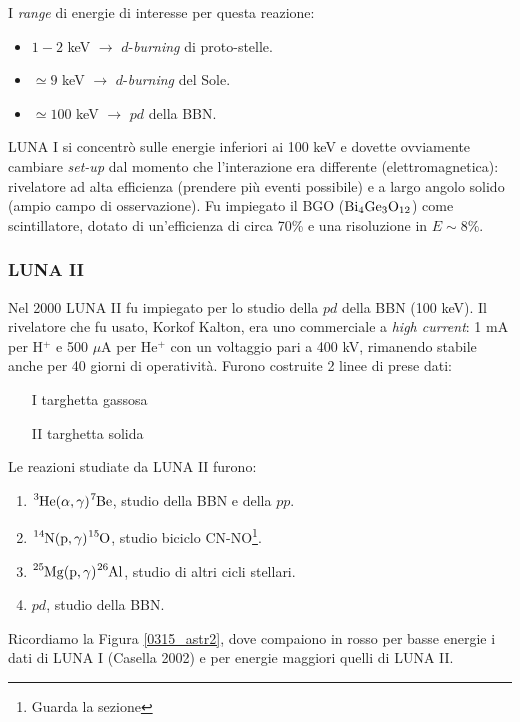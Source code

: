 I \textit{range} di energie di interesse per questa reazione:
\begin{itemize}
	\item $1-2$ keV $\to$ $d$-\textit{burning} di proto-stelle.
	\item $\simeq 9$ keV $\to$ $d$-\textit{burning} del Sole.
	\item $\simeq 100$ keV $\to$ $pd$ della BBN.
\end{itemize}
LUNA I si concentrò sulle energie inferiori ai 100 keV e dovette ovviamente cambiare \textit{set-up} dal momento che l'interazione era differente (elettromagnetica): rivelatore ad alta efficienza (prendere più eventi possibile) e a largo angolo solido (ampio campo di osservazione). Fu impiegato il BGO%
 ($\ce{Bi_4}\ce{Ge_3}\ce{O_{12}}$) come scintillatore, dotato di un'efficienza di circa 70\% e una risoluzione in $E\sim 8\%$.


\subsubsection{LUNA II}\label{sec-LUNAII}
Nel 2000 LUNA II fu impiegato per lo studio della $pd$ della BBN (100 keV). Il rivelatore che fu usato, Korkof Kalton, era uno commerciale a \textit{high current}: 1 mA per H$^+$ e 500 $\mu$A per He$^+$ con un voltaggio pari a 400 kV, rimanendo stabile anche per 40 giorni di operatività. Furono costruite 2 linee di prese dati:
\begin{enumerate}
	\item[I] targhetta gassosa
	\item[II] targhetta solida
\end{enumerate}
Le reazioni studiate da LUNA II furono:
\begin{enumerate}
	\item $\ce{^3He(\alpha,\gamma)\ce{^7Be}}$, studio della BBN e della $pp$.
	\item $\ce{^{14}N(p,\gamma)^{15}O}$, studio biciclo CN-NO\footnote{Guarda la sezione}.%
	\item $\ce{^{25}Mg(p,\gamma)^{26}Al}$, studio di altri cicli stellari.
	\item $pd$, studio della BBN. 
\end{enumerate}
Ricordiamo la Figura \ref{0315_astr2}, dove compaiono in rosso per basse energie i dati di LUNA I (Casella 2002) e per energie maggiori quelli di LUNA II.

